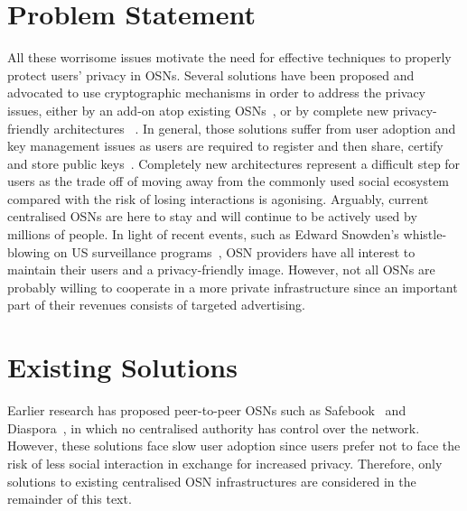 \section{Problem Statement}
\label{sec:problem_statement}
All these worrisome issues motivate the need for effective techniques to properly protect users' privacy in OSNs. Several solutions have been proposed and advocated to use cryptographic mechanisms in order to address the privacy issues, either by an add-on atop existing OSNs~\cite{art:BadenBSBS09,art:BeatoKW11,art:GuhaSTF08,art:LuoXH09}, or by complete new privacy-friendly architectures~ \cite{art:CristofaroSTW11,art:CutilloMO11,NYT2010.Diaspora}. In general, those solutions suffer from user adoption and key management issues as users are required to register and then share, certify and store public keys~\cite{art:BalseBADG14}. Completely new architectures represent a difficult step for users as the trade off of moving away from the commonly used social ecosystem compared with the risk of losing interactions is agonising. Arguably, current centralised OSNs are here to stay and will continue to be actively used by millions of people. In light of recent events, such as Edward Snowden's whistle-blowing on US surveillance programs~\cite{prism}, OSN providers have all interest to maintain their users and a privacy-friendly image. However, not all OSNs are probably willing to cooperate in a more private infrastructure since an important part of their revenues consists of targeted advertising.


\section{Existing Solutions}
\label{sec:existing_solutions}
Earlier research has proposed peer-to-peer OSNs such as Safebook~\cite{art:CutilloMO11} and Diaspora~\cite{NYT2010.Diaspora}, in which no centralised authority has control over the network. However, these solutions face slow user adoption since users prefer not to face the risk of less social interaction in exchange for increased privacy. Therefore, only solutions to existing centralised OSN infrastructures are considered in the remainder of this text.

